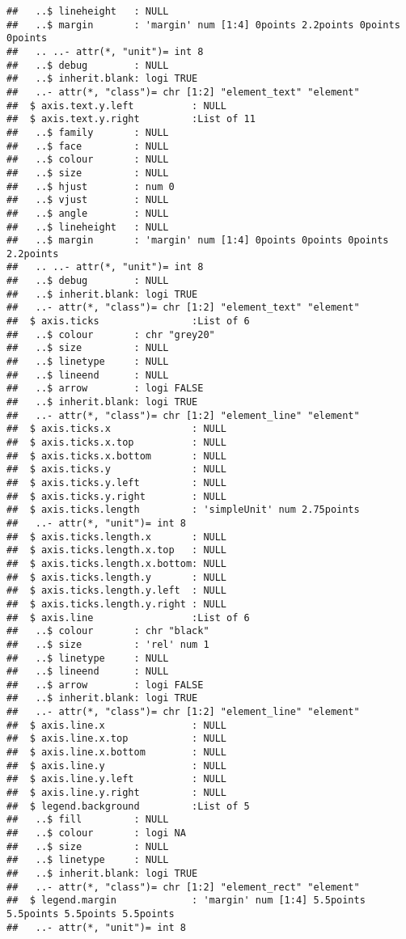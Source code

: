 \documentclass[
]{article}
\begin{document}
\begin{verbatim}
##   ..$ lineheight   : NULL
##   ..$ margin       : 'margin' num [1:4] 0points 2.2points 0points 0points
##   .. ..- attr(*, "unit")= int 8
##   ..$ debug        : NULL
##   ..$ inherit.blank: logi TRUE
##   ..- attr(*, "class")= chr [1:2] "element_text" "element"
##  $ axis.text.y.left          : NULL
##  $ axis.text.y.right         :List of 11
##   ..$ family       : NULL
##   ..$ face         : NULL
##   ..$ colour       : NULL
##   ..$ size         : NULL
##   ..$ hjust        : num 0
##   ..$ vjust        : NULL
##   ..$ angle        : NULL
##   ..$ lineheight   : NULL
##   ..$ margin       : 'margin' num [1:4] 0points 0points 0points 2.2points
##   .. ..- attr(*, "unit")= int 8
##   ..$ debug        : NULL
##   ..$ inherit.blank: logi TRUE
##   ..- attr(*, "class")= chr [1:2] "element_text" "element"
##  $ axis.ticks                :List of 6
##   ..$ colour       : chr "grey20"
##   ..$ size         : NULL
##   ..$ linetype     : NULL
##   ..$ lineend      : NULL
##   ..$ arrow        : logi FALSE
##   ..$ inherit.blank: logi TRUE
##   ..- attr(*, "class")= chr [1:2] "element_line" "element"
##  $ axis.ticks.x              : NULL
##  $ axis.ticks.x.top          : NULL
##  $ axis.ticks.x.bottom       : NULL
##  $ axis.ticks.y              : NULL
##  $ axis.ticks.y.left         : NULL
##  $ axis.ticks.y.right        : NULL
##  $ axis.ticks.length         : 'simpleUnit' num 2.75points
##   ..- attr(*, "unit")= int 8
##  $ axis.ticks.length.x       : NULL
##  $ axis.ticks.length.x.top   : NULL
##  $ axis.ticks.length.x.bottom: NULL
##  $ axis.ticks.length.y       : NULL
##  $ axis.ticks.length.y.left  : NULL
##  $ axis.ticks.length.y.right : NULL
##  $ axis.line                 :List of 6
##   ..$ colour       : chr "black"
##   ..$ size         : 'rel' num 1
##   ..$ linetype     : NULL
##   ..$ lineend      : NULL
##   ..$ arrow        : logi FALSE
##   ..$ inherit.blank: logi TRUE
##   ..- attr(*, "class")= chr [1:2] "element_line" "element"
##  $ axis.line.x               : NULL
##  $ axis.line.x.top           : NULL
##  $ axis.line.x.bottom        : NULL
##  $ axis.line.y               : NULL
##  $ axis.line.y.left          : NULL
##  $ axis.line.y.right         : NULL
##  $ legend.background         :List of 5
##   ..$ fill         : NULL
##   ..$ colour       : logi NA
##   ..$ size         : NULL
##   ..$ linetype     : NULL
##   ..$ inherit.blank: logi TRUE
##   ..- attr(*, "class")= chr [1:2] "element_rect" "element"
##  $ legend.margin             : 'margin' num [1:4] 5.5points 5.5points 5.5points 5.5points
##   ..- attr(*, "unit")= int 8

\end{verbatim}
\end{document}
